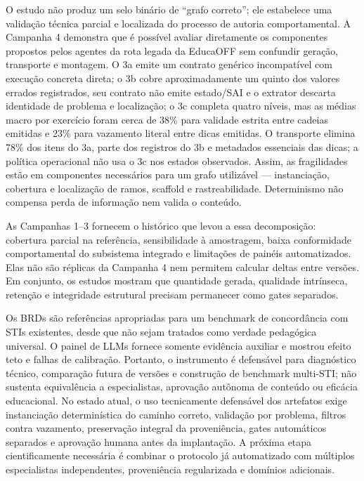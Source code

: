 \documentclass[11pt,a4paper]{article}
\begin{document}
O estudo não produz um selo binário de ``grafo correto''; ele estabelece uma validação técnica parcial e localizada do processo de autoria comportamental. A Campanha 4 demonstra que é possível avaliar diretamente os componentes propostos pelos agentes da rota legada da EducaOFF sem confundir geração, transporte e montagem. O 3a emite um contrato genérico incompatível com execução concreta direta; o 3b cobre aproximadamente um quinto dos valores errados registrados, seu contrato não emite estado/SAI e o extrator descarta identidade de problema e localização; o 3c completa quatro níveis, mas as médias macro por exercício foram cerca de 38\% para validade estrita entre cadeias emitidas e 23\% para vazamento literal entre dicas emitidas. O transporte elimina 78\% dos itens do 3a, parte dos registros do 3b e metadados essenciais das dicas; a política operacional não usa o 3c nos estados observados. Assim, as fragilidades estão em componentes necessários para um grafo utilizável --- instanciação, cobertura e localização de ramos, scaffold e rastreabilidade. Determinismo não compensa perda de informação nem valida o conteúdo.

As Campanhas 1--3 fornecem o histórico que levou a essa decomposição: cobertura parcial na referência, sensibilidade à amostragem, baixa conformidade comportamental do subsistema integrado e limitações de painéis automatizados. Elas não são réplicas da Campanha 4 nem permitem calcular deltas entre versões. Em conjunto, os estudos mostram que quantidade gerada, qualidade intrínseca, retenção e integridade estrutural precisam permanecer como gates separados.

Os BRDs são referências apropriadas para um benchmark de concordância com STIs existentes, desde que não sejam tratados como verdade pedagógica universal. O painel de LLMs fornece somente evidência auxiliar e mostrou efeito teto e falhas de calibração. Portanto, o instrumento é defensável para diagnóstico técnico, comparação futura de versões e construção de benchmark multi-STI; não sustenta equivalência a especialistas, aprovação autônoma de conteúdo ou eficácia educacional. No estado atual, o uso tecnicamente defensável dos artefatos exige instanciação determinística do caminho correto, validação por problema, filtros contra vazamento, preservação integral da proveniência, gates automáticos separados e aprovação humana antes da implantação. A próxima etapa cientificamente necessária é combinar o protocolo já automatizado com múltiplos especialistas independentes, proveniência regularizada e domínios adicionais.
\end{document}
